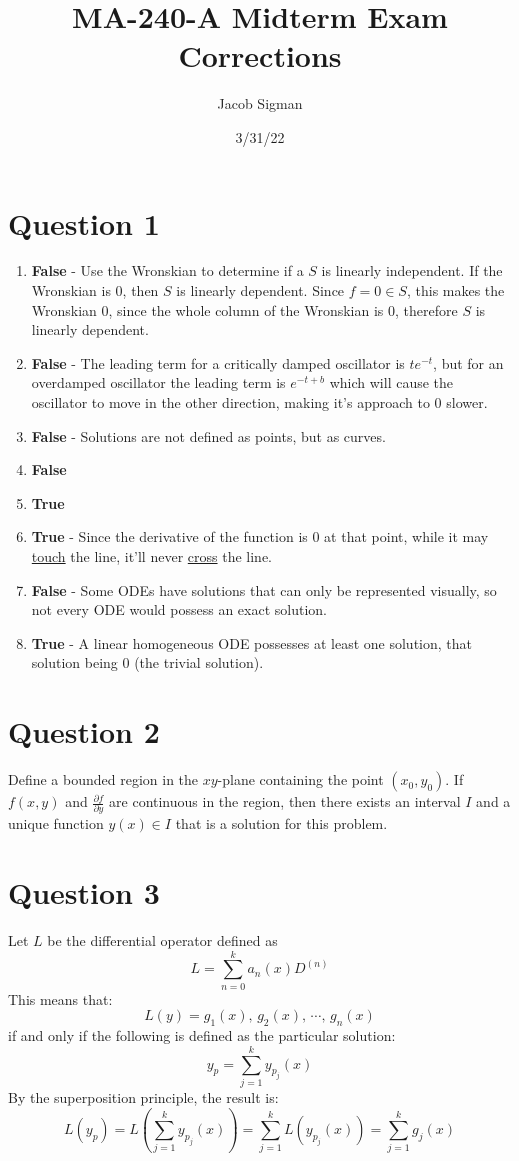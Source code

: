 \documentclass{article}
\title{MA-240-A Midterm Exam Corrections}
\author{Jacob Sigman}
\date{3/31/22}
\begin{document}
\maketitle
\newpage
\tableofcontents
\newpage
\section*{Question 1}
\begin{enumerate}
    \item \textbf{False} - Use the Wronskian to determine if a \(S\) is linearly independent. If the Wronskian is 0, then \(S\) is linearly dependent. Since \(f=0\in S\), this makes the Wronskian 0, since the whole column of the Wronskian is 0, therefore \(S\) is linearly dependent.
    \item \textbf{False} - The leading term for a critically damped oscillator is \(te^{-t}\), but for an overdamped oscillator the leading term is \(e^{-t+b}\) which will cause the oscillator to move in the other direction, making it's approach to 0 slower.
    \item \textbf{False} - Solutions are not defined as points, but as curves.
    \item \textbf{False}
    \item \textbf{True}
    \item \textbf{True} - Since the derivative of the function is 0 at that point, while it may \underline{touch} the line, it'll never \underline{cross} the line.
    \item \textbf{False} - Some ODEs have solutions that can only be represented visually, so not every ODE would possess an exact solution.
    \item \textbf{True} - A linear homogeneous ODE possesses at least one solution, that solution being 0 (the trivial solution).
\end{enumerate}
\section*{Question 2}
Define a bounded region in the \(xy\)-plane containing the point \((x_0, y_0)\). If \(f(x,y)\) and \(\frac{\partial f}{\partial y}\) are continuous in the region, then there exists an interval \(I\) and a unique function \(y(x)\in I\) that is a solution for this problem.
\section*{Question 3}
\begin{center}
Let \(L\) be the differential operator defined as
\[L=\sum_{n=0}^{k}a_n(x)D^{(n)}\]
This means that:
\[L(y)=g_1(x),\,g_2(x),\,\cdots,\,g_n(x)\]
if and only if the following is defined as the particular solution:
\[y_p=\sum_{j=1}^ky_{p_j}(x)\]
By the superposition principle, the result is:
\[L(y_p)=L\left(\sum_{j=1}^ky_{p_j}(x)\right)=\sum_{j=1}^kL\left(y_{p_j}(x)\right)=\sum_{j=1}^kg_j(x)\]
\end{center}
\end{document}
